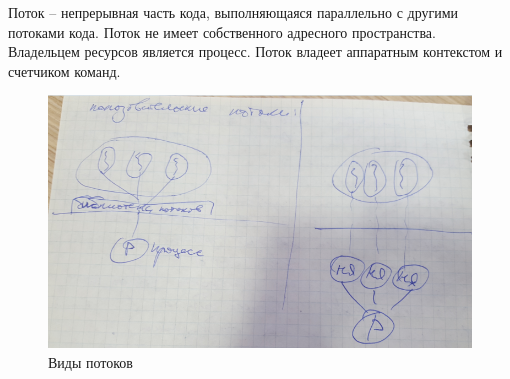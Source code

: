 Поток – непрерывная часть кода, выполняющаяся параллельно с другими потоками кода. Поток не имеет собственного адресного пространства. Владельцем ресурсов является процесс. Поток владеет аппаратным контекстом и счетчиком команд. 

\begin{figure}[H]
  \centering
  \includegraphics[width=\textwidth]{pic/3.png}
  \caption{Виды потоков}
\end{figure}
